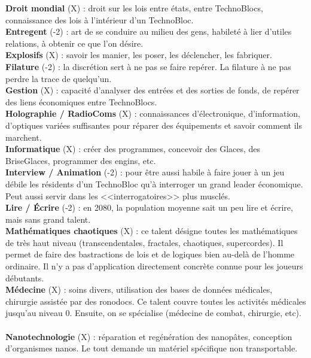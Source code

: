\documentclass[11pt,twoside,a4paper]{article}
\begin{document}
\begin{multicols*}{2}
{\textbf{Droit mondial} (X) : droit sur les lois entre {\'e}tats, entre TechnoBlocs, connaissance des lois {\`a} l'int{\'e}rieur d'un TechnoBloc. ~\\
\textbf{Entregent} (-2) : art de se conduire au milieu des gens, habilet{\'e} {\`a} lier d'utiles relations, {\`a} obtenir ce que l'on d{\'e}sire. ~\\
\textbf{Explosifs} (X) : savoir les manier, les poser, les d{\'e}clencher, les fabriquer. ~\\
\textbf{Filature} (-2) : la discr{\'e}tion sert {\`a} ne pas se faire rep{\'e}rer. La filature {\`a} ne pas perdre la trace de quelqu'un. ~\\
\textbf{Gestion} (X) : capacit{\'e} d'analyser des entr{\'e}es et des sorties de fonds, de rep{\'e}rer des liens {\'e}conomiques entre TechnoBlocs. ~\\
\textbf{Holographie / RadioComs} (X) : connaissances d'{\'e}lectronique, d'information, d'optiques vari{\'e}es suffisantes pour r{\'e}parer des {\'e}quipements et savoir comment ils marchent. ~\\
\textbf{Informatique} (X) : cr{\'e}er des programmes, concevoir des Glaces, des BriseGlaces, programmer des engins, etc. ~\\
\textbf{Interview / Animation} (-2) : pour {\^e}tre aussi habile {\`a} faire jouer {\`a} un jeu d{\'e}bile les r{\'e}sidents d'un TechnoBloc qu'{\`a} interroger un grand leader {\'e}conomique. Peut aussi servir dans les <<interrogatoires>> plus muscl{\'e}s. ~\\
\textbf{Lire / {\'E}crire} (-2) : en 2080, la population moyenne sait un peu lire et {\'e}crire, mais sans grand talent. ~\\
\textbf{Math{\'e}matiques chaotiques} (X) : ce talent d{\'e}signe toutes les math{\'e}matiques de tr{\`e}s haut niveau (transcendentales, fractales, chaotiques, supercordes). Il permet de faire des bastractions de lois et de logiques bien au-del{\`a} de l'homme ordinaire. Il n'y a pas d'application directement concr{\`e}te connue pour les joueurs d{\'e}butants. ~\\
\textbf{M{\'e}decine} (X) : soins divers, utilisation des bases de donn{\'e}es m{\'e}dicales, chirurgie assist{\'e}e par des ronodocs. Ce talent couvre toutes les activit{\'e}s m{\'e}dicales jusqu'au niveau 0. Ensuite, on se sp{\'e}cialise (m{\'e}decine de combat, chirurgie, etc). ~\\
\textbf{Nanotechnologie} (X) : r{\'e}paration et reg{\'e}n{\'e}ration des nanop{\^a}tes, conception d'organismes nanos. Le tout demande un mat{\'e}riel sp{\'e}cifique non transportable. ~\\
}
\end{multicols*}
\end{document}
